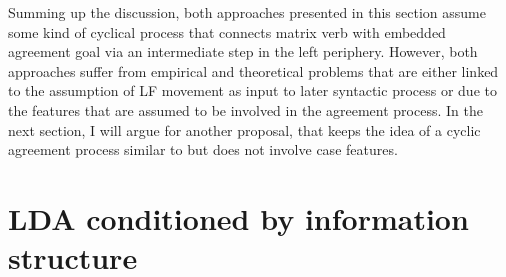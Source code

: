\documentclass[output=paper
,modfonts
,nonflat]{langsci/langscibook}
\begin{document}
Summing up the discussion, both approaches presented in this section assume some kind of cyclical process that connects matrix verb with embedded agreement goal via an intermediate step in the left periphery. However, both approaches suffer from empirical and theoretical problems that are either linked to the assumption of LF movement as input to later syntactic process or due to the features that are assumed to be involved in the agreement process. In the next section, I will argue for another proposal, that keeps the idea of a cyclic agreement process similar to \citet{Bjorkman_Zeijlstra2014} but does not involve case features.

\section{LDA conditioned by information structure}
\label{ch:4}
\end{document}
